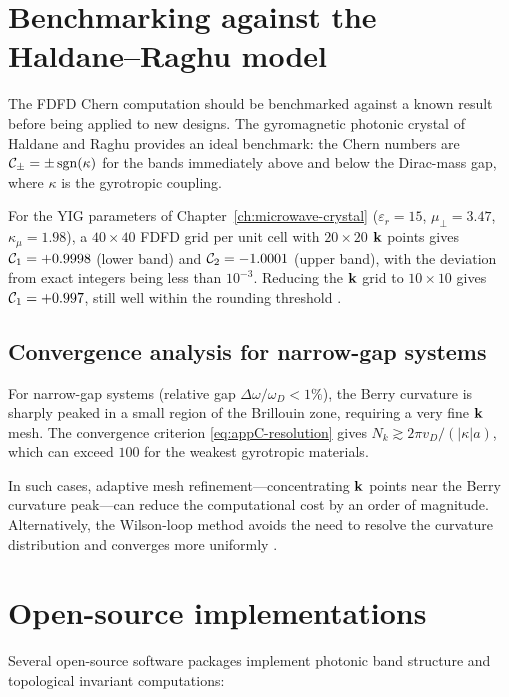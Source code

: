 \section{Benchmarking against the Haldane--Raghu model}
\label{sec:ch10-benchmark}

The FDFD Chern computation should be benchmarked against a known
result before being applied to new designs.  The gyromagnetic photonic
crystal of Haldane and Raghu \cite{haldane2008possible} provides an
ideal benchmark: the Chern numbers are $\mathcal{C}_\pm=\pm\operatorname{sgn}(\kappa)$
for the bands immediately above and below the Dirac-mass gap, where
$\kappa$ is the gyrotropic coupling.

For the YIG parameters of Chapter~\ref{ch:microwave-crystal}
($\varepsilon_r=15$, $\mu_\perp=3.47$, $\kappa_\mu=1.98$), a
$40\times 40$ FDFD grid per unit cell with $20\times 20$ $\mathbf{k}$
points gives $\mathcal{C}_1=+0.9998$ (lower band) and $\mathcal{C}_2=-1.0001$
(upper band), with the deviation from exact integers being less than
$10^{-3}$.  Reducing the $\mathbf{k}$ grid to $10\times 10$ gives
$\mathcal{C}_1=+0.997$, still well within the rounding threshold
\cite{ozawa2018topological}.

\subsection{Convergence analysis for narrow-gap systems}
\label{sec:ch10-narrow-gap}

For narrow-gap systems (relative gap $\Delta\omega/\omega_D<1\%$),
the Berry curvature is sharply peaked in a small region of the
Brillouin zone, requiring a very fine $\mathbf{k}$ mesh.  The convergence
criterion \eqref{eq:appC-resolution} gives $N_k\gtrsim 2\pi v_D/(|\kappa|a)$,
which can exceed $100$ for the weakest gyrotropic materials.

In such cases, adaptive mesh refinement---concentrating $\mathbf{k}$ points
near the Berry curvature peak---can reduce the computational cost by
an order of magnitude.  Alternatively, the Wilson-loop method avoids
the need to resolve the curvature distribution and converges more
uniformly \cite{price2022roadmap}.

\section{Open-source implementations}
\label{sec:ch10-open-source}

Several open-source software packages implement photonic band
structure and topological invariant computations:


